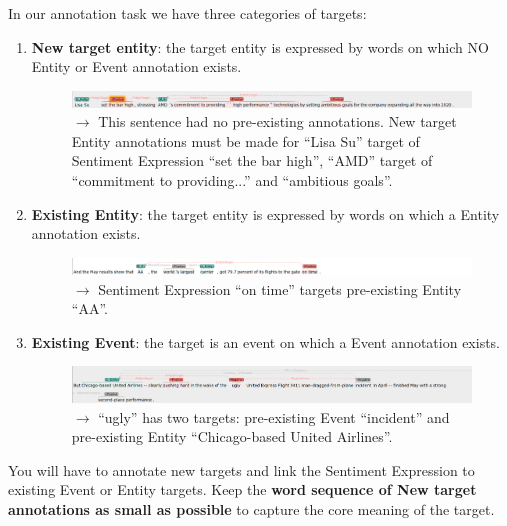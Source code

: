 \noindent
In our annotation task we have three categories of targets:
\begin{enumerate}[label=\alph*), leftmargin=*]
    \item \textbf{New target entity}: the target entity is expressed by words on which NO Entity or Event annotation exists.
    \begin{figure}[!htb]
    \centering
    \includegraphics[width=\textwidth]{img/amd02s08 new entity.png}
    \caption*{$\rightarrow$ This sentence had no pre-existing annotations. New target Entity annotations must be made for ``Lisa Su'' target of Sentiment Expression ``set the bar high'', ``AMD'' target of ``commitment to providing...'' and ``ambitious goals''.}
\end{figure}

    \item \textbf{Existing Entity}: the target entity is expressed by words on which a \entitycolor Entity annotation exists.
    \begin{figure}[!htb]
    \centering
    \includegraphics[width=\textwidth]{img/aal02s11 entity .png}
    \caption*{$\rightarrow$ Sentiment Expression ``on time'' targets pre-existing Entity ``AA''.}
\end{figure}
    
    \item \textbf{Existing Event}: the target is an event on which a \eventcolor Event annotation exists.
    \begin{figure}[!htb]
    \centering
    \includegraphics[width=\textwidth]{img/aal02s06 entity target example.png}
    \caption*{$\rightarrow$ ``ugly'' has two targets: pre-existing Event ``incident'' and pre-existing Entity ``Chicago-based United Airlines''.}
\end{figure}
\end{enumerate}

You will have to annotate new targets and link the Sentiment Expression to existing Event or Entity targets.
Keep the \textbf{word sequence of New target annotations as small as possible} to capture the core meaning of the target.

